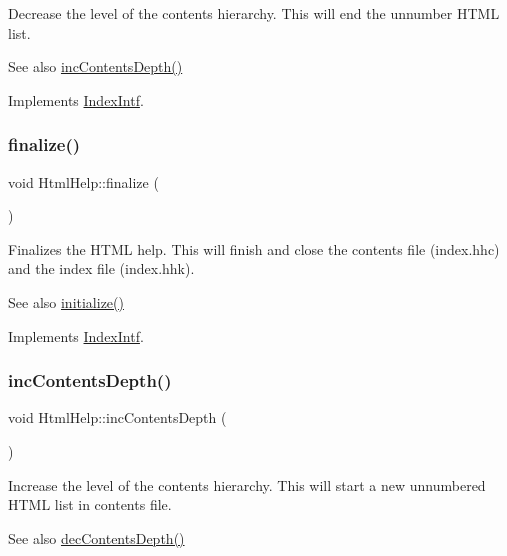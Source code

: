 Decrease the level of the contents hierarchy. This will end the unnumber H\+T\+ML list. \begin{DoxySeeAlso}{See also}
\mbox{\hyperlink{class_html_help_aca0008f8813f28f23ca5bcaea25a7bec}{inc\+Contents\+Depth()}} 
\end{DoxySeeAlso}


Implements \mbox{\hyperlink{class_index_intf}{Index\+Intf}}.

\mbox{\label{class_html_help_a66375adceef242d73c6554bd7fba6cf7}} 
\subsubsection{\texorpdfstring{finalize()}{finalize()}}
{\footnotesize\ttfamily void Html\+Help\+::finalize (\begin{DoxyParamCaption}{ }\end{DoxyParamCaption})\hspace{0.3cm}{\ttfamily [virtual]}}

Finalizes the H\+T\+ML help. This will finish and close the contents file (index.\+hhc) and the index file (index.\+hhk). \begin{DoxySeeAlso}{See also}
\mbox{\hyperlink{class_html_help_acf6cb7c477c71f2031b5831f979991d5}{initialize()}} 
\end{DoxySeeAlso}


Implements \mbox{\hyperlink{class_index_intf}{Index\+Intf}}.

\mbox{\label{class_html_help_aca0008f8813f28f23ca5bcaea25a7bec}} 
\subsubsection{\texorpdfstring{incContentsDepth()}{incContentsDepth()}}
{\footnotesize\ttfamily void Html\+Help\+::inc\+Contents\+Depth (\begin{DoxyParamCaption}{ }\end{DoxyParamCaption})\hspace{0.3cm}{\ttfamily [virtual]}}

Increase the level of the contents hierarchy. This will start a new unnumbered H\+T\+ML list in contents file. \begin{DoxySeeAlso}{See also}
\mbox{\hyperlink{class_html_help_ad76b300748e818d96676f0743738090d}{dec\+Contents\+Depth()}} 
\end{DoxySeeAlso}


